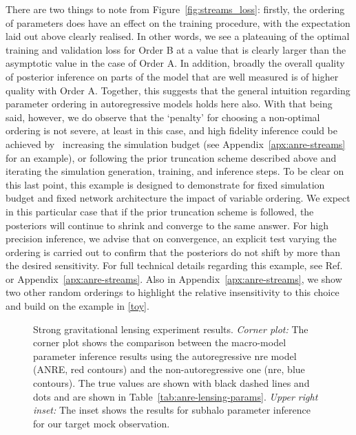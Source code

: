 There are two things to note from Figure~\ref{fig:streams_loss}: firstly, the ordering of parameters does have an effect on the training procedure, with the expectation laid out above clearly realised. In other words, we see a plateauing of the optimal training and validation loss for Order B at a value that is clearly larger than the asymptotic value in the case of Order A. In addition, broadly the overall quality of posterior inference on parts of the model that are well measured is of higher quality with Order A. Together, this suggests that the general intuition regarding parameter ordering in autoregressive models holds here also. With that being said, however, we do observe that the `penalty' for choosing a non-optimal ordering is not severe, at least in this case, and high fidelity inference could be achieved by \eg~increasing the simulation budget (see Appendix~\ref{apx:anre-streams} for an example), or following the prior truncation scheme described above and iterating the simulation generation, training, and inference steps. To be clear on this last point, this example is designed to demonstrate for fixed simulation budget and fixed network architecture the impact of variable ordering. We expect in this particular case that if the prior truncation scheme is followed, the posteriors will continue to shrink and converge to the same answer. For high precision inference, we advise that on convergence, an explicit test varying the ordering is carried out to confirm that the posteriors do not shift by more than the desired sensitivity. For full technical details regarding this example, see Ref.~\cite{Alvey:2023pkx} or Appendix~\ref{apx:anre-streams}.  Also in Appendix~\ref{apx:anre-streams}, we show two other random orderings to highlight the relative insensitivity to this choice and build on the example in \autoref{toy}.

\begin{figure}
\caption{Strong gravitational lensing experiment results. \emph{Corner plot:} The corner plot shows the comparison between the macro-model parameter inference results using the autoregressive \gls*{nre} model (ANRE, red contours) and the non-autoregressive one (\gls*{nre}, blue contours). The true values are shown with black dashed lines and dots and are shown in Table~\ref{tab:anre-lensing-params}. \emph{Upper right inset:} The inset shows the results for subhalo parameter inference for our target mock observation.
}
\label{fig:corner}
\end{figure}


